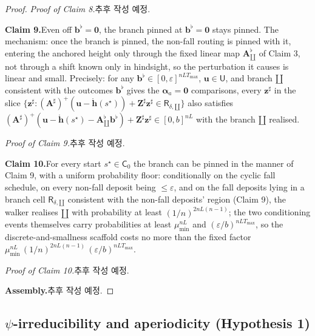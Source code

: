 \documentclass[11pt]{article}
\theoremstyle{definition}
\begin{document}
\begin{proof}
\noindent\emph{Proof of Claim 8.}\quad 추후 작성 예정.

\smallskip\noindent\textbf{Claim 9.}\quad Even off $\mathbf{b}^{\flat}=\mathbf{0}$, the branch pinned at $\mathbf{b}^{\flat}=\mathbf{0}$ stays pinned. The mechanism: once the branch is pinned, the non-fall routing is pinned with it, entering the anchored height only through the fixed linear map $\mathbf{A}^{\flat}_{\amalg}$ of Claim 3, not through a shift known only in hindsight, so the perturbation it causes is linear and small. Precisely: for any $\mathbf{b}^{\flat}\in[0,\varepsilon]^{nLT_{\max}}$, $\mathbf{u}\in \mathsf{U}$, and branch $\amalg$ consistent with the outcomes $\mathbf{b}^{\flat}$ gives the $\boldsymbol{\alpha}_a=\mathbf{0}$ comparisons, every $\mathbf{z}^{\sharp}$ in the slice $\{\mathbf{z}^{\sharp} : (\mathbf{A}^{\sharp})^{+}(\mathbf{u}-\mathring{\mathbf{h}}(s^{\star}))+\mathbf{Z}^{\sharp}\mathbf{z}^{\sharp}\in\mathsf{R}_{\delta,\amalg}\}$ also satisfies $(\mathbf{A}^{\sharp})^{+}(\mathbf{u}-\mathring{\mathbf{h}}(s^{\star})-\mathbf{A}^{\flat}_{\amalg}\mathbf{b}^{\flat})+\mathbf{Z}^{\sharp}\mathbf{z}^{\sharp}\in[0,b]^{nL}$ with the branch $\amalg$ realised.

\noindent\emph{Proof of Claim 9.}\quad 추후 작성 예정.

\smallskip\noindent\textbf{Claim 10.}\quad For every start $s^{\star}\in\mathsf{C}_0$ the branch can be pinned in the manner of Claim 9, with a uniform probability floor: conditionally on the cyclic fall schedule, on every non-fall deposit being $\leq\varepsilon$, and on the fall deposits lying in a branch cell $\mathsf{R}_{\delta,\amalg}$ consistent with the non-fall deposits' region (Claim 9), the walker realises $\amalg$ with probability at least $(1/n)^{2nL(n-1)}$; the two conditioning events themselves carry probabilities at least $\mu_{\min}^{nL}$ and $(\varepsilon/b)^{nLT_{\max}}$, so the discrete-and-smallness scaffold costs no more than the fixed factor $\mu_{\min}^{nL}\,(1/n)^{2nL(n-1)}\,(\varepsilon/b)^{nLT_{\max}}$.

\noindent\emph{Proof of Claim 10.}\quad 추후 작성 예정.

\smallskip\noindent\textbf{Assembly.}\quad 추후 작성 예정.
\end{proof}

\subsection{\texorpdfstring{$\psi$}{psi}-irreducibility and aperiodicity (Hypothesis 1)}
\label{sub:irr}
\end{document}
